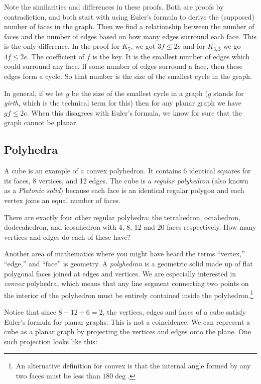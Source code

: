 \documentclass[12pt]{article}
\begin{document}
Note the similarities and differences in these proofs.  Both are proofs by contradiction, and both start with using Euler's formula to derive the (supposed) number of faces in the graph.  Then we find a relationship between the number of faces and the number of edges based on how many edges surround each face.  This is the only difference.  In the proof for $K_5$, we got $3f \le 2e$ and for $K_{3,3}$ we go $4f \le 2e$.  The coefficient of $f$ is the key.  It is the smallest number of edges which could surround any face.  If some number of edges surround a face, then these edges form a cycle.  So that number is the size of the smallest cycle in the graph.

In general, if we let $g$ be the size of the smallest cycle in a graph ($g$ stands for {\em girth}, which is the technical term for this) then for any planar graph we have $gf \le 2e$.  When this disagrees with Euler's formula, we know for sure that the graph cannot be planar.

\subsection{Polyhedra}
\begin{activity}
A cube is an example of a convex polyhedron.  It contains 6 identical squares for its faces, 8 vertices, and 12 edges.  The cube is a \emph{regular polyhedron} (also known as a \emph{Platonic solid}) because each face is an identical regular polygon and each vertex joins an equal number of faces.

There are exactly four other regular polyhedra: the tetrahedron, octahedron, dodecahedron, and icosahedron with 4, 8, 12 and 20 faces respectively.  How many vertices and edges do each of these have?
\end{activity}

Another area of mathematics where you might have heard the terms ``vertex,'' ``edge,'' and ``face'' is geometry.  A \emph{polyhedron} is a geometric solid made up of flat polygonal faces joined at edges and vertices.  We are especially interested in \emph{convex} polyhedra, which means that any line segment connecting two points on the interior of the polyhedron must be entirely contained inside the polyhedron.\footnote{An alternative definition for convex is that the internal angle formed by any two faces must be less than $180\deg$.}


Notice that since $8 - 12 + 6 = 2$, the vertices, edges and faces of a cube satisfy Euler's formula for planar graphs.  This is not a coincidence.  We can represent a cube as a planar graph by projecting the vertices and edges onto the plane.  One such projection looks like this:
\end{document}

